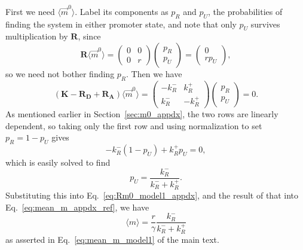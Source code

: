 First we need $\langle\vec{m}^0\rangle$. Label its components as $p_R$ and
$p_U$, the probabilities of finding the system in either promoter state, and
note that only $p_U$ survives multiplication by $\mathbf{R}$, since
\begin{equation}
\mathbf{R} \langle\vec{m}^0\rangle
= \begin{pmatrix} 0 & 0 \\ 0 & r \end{pmatrix}
    \begin{pmatrix} p_R \\ p_U \end{pmatrix}
= \begin{pmatrix} 0 \\ r p_U \end{pmatrix},
\label{eq:Rm0_model1_appdx}
\end{equation}
so we need not bother finding $p_R$. Then we have
\begin{equation}
(\mathbf{K} - \mathbf{R_D} + \mathbf{R_A}) \langle\vec{m}^0\rangle
= \begin{pmatrix} -k_R^- & k_R^+ \\ k_R^- & -k_R^+ \end{pmatrix}
    \begin{pmatrix} p_R \\ p_U \end{pmatrix} = 0.
\label{eq:model1_m0_giver_appdx}
\end{equation}
As mentioned earlier in Section~\ref{sec:m0_appdx}, the two rows are linearly
dependent, so taking only the first row and using normalization to set $p_R =
1-p_U$ gives
\begin{equation}
-k_R^- (1-p_U) + k_R^+ p_U = 0,
\end{equation}
which is easily solved to find
\begin{equation}
p_U = \frac{k_R^-}{k_R^- + k_R^+}.
\end{equation}
Substituting this into Eq.~\ref{eq:Rm0_model1_appdx}, and the result of that
into Eq.~\ref{eq:mean_m_appdx_ref}, we have
\begin{equation}
\langle{m}\rangle = \frac{r}{\gamma} \frac{k_R^-}{k_R^- + k_R^+}
\end{equation}
as asserted in Eq.~\ref{eq:mean_m_model1} of the main text.

